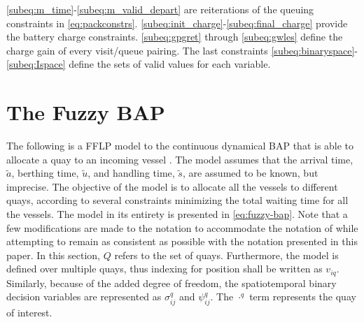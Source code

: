 \documentclass[11pt,a4paper,final]{article}
\begin{document}
\autoref{subeq:m_time}-\autoref{subeq:m_valid_depart} are reiterations of the queuing constraints in
\autoref{eq:packconstrs}. \autoref{subeq:init_charge}-\autoref{subeq:final_charge} provide the battery charge
constraints. \autoref{subeq:gpgret} through \autoref{subeq:gwles} define the charge gain of every visit/queue
pairing. The last constraints \autoref{subeq:binaryspace}-\autoref{subeq:Ispace} define the sets of valid values for each
variable.
\section{The Fuzzy BAP}
\label{sec:the-fuzzy-bap}
The following is a FFLP model to the continuous dynamical BAP that is able to allocate a quay to an incoming vessel
\cite{bello-2019-fuzzy-activ}. The model assumes that the arrival time, \(\tilde{a}\), berthing time, \(\tilde{u}\), and
handling time, \(\tilde{s}\), are assumed to be known, but imprecise. The objective of the model is to allocate all the
vessels to different quays, according to several constraints minimizing the total waiting time for all the vessels. The
model in its entirety is presented in \ref{eq:fuzzy-bap}. Note that a few modifications are made to the notation to
accommodate the notation of \cite{bello-2019-fuzzy-activ} while attempting to remain as consistent as possible with the
notation presented in this paper. In this section, \(Q\) refers to the set of quays. Furthermore, the model is defined
over multiple quays, thus indexing for position shall be written as \(v_{iq}\). Similarly, because of the added degree of
freedom, the spatiotemporal binary decision variables are represented as \(\sigma^q_{ij}\) and \(\psi^q_{ij}\). The \(\cdot^q\) term
represents the quay of interest.
\end{document}
